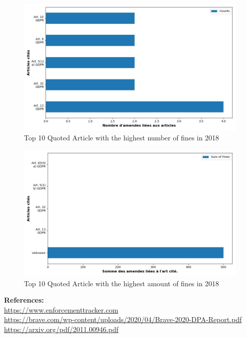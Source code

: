 \documentclass[12pt]{article}
\begin{document}
	\begin{multicols}{2}
	\begin{figure}
		[H]\centering\includegraphics[width=1.0\linewidth]{graphs/top10_quoted_year}
		\caption{Top 10 Quoted Article with the highest number of fines in 2018}
	\end{figure}
	\begin{figure}
		[H]\centering\includegraphics[width=1\linewidth]{graphs/top10_quoted_year_fines}
		\caption{Top 10 Quoted Article with the highest amount of fines in 2018}
	 \end{figure}
	
	\end{multicols}









\vspace*{\fill}
\textbf{References:}\\
\href{https://www.enforcementtracker.com}{https://www.enforcementtracker.com}\\
\href{https://brave.com/wp-content/uploads/2020/04/Brave-2020-DPA-Report.pdf}{https://brave.com/wp-content/uploads/2020/04/Brave-2020-DPA-Report.pdf}\\
\href{https://arxiv.org/pdf/2011.00946.pdf}{https://arxiv.org/pdf/2011.00946.pdf}
\end{document}
